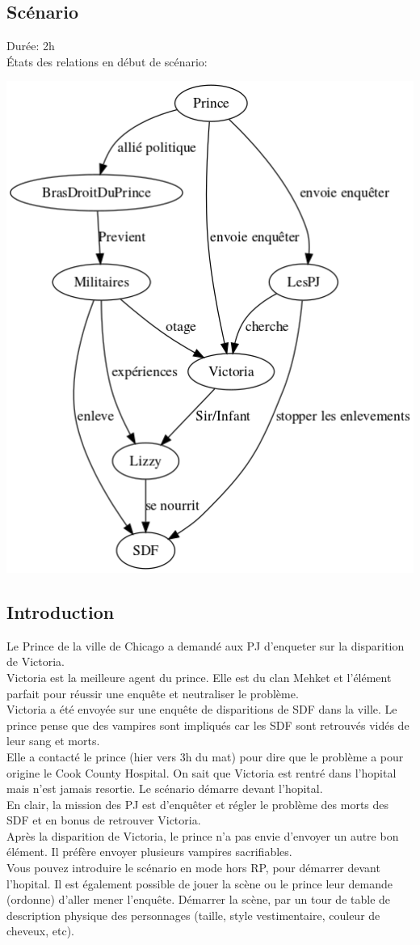 \documentclass[oneside,12pt]{book}
\begin{document}
\begin{flushleft}
\chapter{Scénario}

Durée: 2h \\
États des relations en début de scénario:\\
\begin{center}
\includegraphics[width=0.6\linewidth]{scenario.png}
\end{center}


\section{Introduction}
Le Prince de la ville de Chicago a demandé aux PJ d'enqueter sur la disparition de Victoria.  \\
Victoria est la meilleure agent du prince. Elle est du clan Mehket et l'élément parfait pour réussir une enquête et neutraliser le problème. \\
Victoria a été envoyée sur une enquête de disparitions de SDF dans la ville.
Le prince pense que des vampires sont impliqués car les SDF sont retrouvés vidés de leur sang et morts. \\
Elle a contacté le prince (hier vers 3h du mat) pour dire que le problème a pour origine le Cook County Hospital. On sait que Victoria est rentré dans l'hopital mais n'est jamais resortie.
Le scénario démarre devant l'hopital. \\
\vspace{0.5cm}
En clair, la mission des PJ est d'enquêter et régler le problème des morts des SDF et en bonus de retrouver Victoria. \\
Après la disparition de Victoria, le prince n'a pas envie d'envoyer un autre bon élément. Il préfère envoyer plusieurs vampires sacrifiables.\\
Vous pouvez introduire le scénario en mode hors RP, pour démarrer devant l'hopital. Il est également possible de jouer la scène ou le prince leur demande (ordonne) d'aller mener l'enquête.
Démarrer la scène, par un tour de table de description physique des personnages (taille, style vestimentaire, couleur de cheveux, etc).


\end{flushleft}
\end{document}
